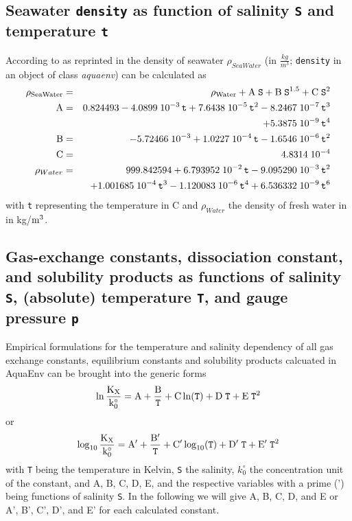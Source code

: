 \documentclass[a4paper]{article}
\begin{document}
\subsection{Seawater \texttt{density} as function of salinity \texttt{S} and temperature \texttt{t}}
According to \citep{Millero1981} as reprinted in \citet[chap. 5, p. 6f]{DOE1994} the density of seawater $\rho_{SeaWater}$ (in $\frac{kg}{m^3}$; \texttt{density} in an object of class \textit{aquaenv}) can be calculated as
\begin{eqnarray}
\rm \rho_{SeaWater} &=&\rm \rho_{Water} + A\;\mbox{\texttt{S}} + B\;\mbox{\texttt{S}}^{1.5} + C\; \mbox{\texttt{S}}^2\\
\rm A &=& \rm 0.824493 - 4.0899 \; 10^{-3} \, \mbox{\texttt{t}} + 7.6438 \; 10^{-5} \, \mbox{\texttt{t}}^2 - 8.2467 \; 10^{-7}  \,\mbox{\texttt{t}}^3\\
  && \rm + 5.3875 \; 10^{-9} \, \mbox{\texttt{t}}^4\\
\rm B &=& \rm -5.72466 \; 10^{-3} + 1.0227 \; 10^{-4} \, \mbox{\texttt{t}} - 1.6546\; 10^{-6} \, \mbox{\texttt{t}}^2 \\
\rm C &=& 4.8314\;10^{-4} \\
\rho_{Water} &=& 999.842594 + 6.793952\;10^{-2} \, \mbox{\texttt{t}} - 9.095290\;10^{-3} \, \mbox{\texttt{t}}^2\\
                                    && + 1.001685\;10^{-4}\,\mbox{\texttt{t}}^3 - 1.120083\;10^{-6} \, \mbox{\texttt{t}}^4 + 6.536332\;10^{-9} \, \mbox{\texttt{t}}^6
\end{eqnarray}
\noindent
with \texttt{t} representing the temperature in \textdegree$ $C and $\rho_{Water}$ the density of fresh water in in kg/$\rm m^3$.

\subsection{Gas-exchange constants, dissociation constant, and solubility products as functions of salinity \texttt{S}, (absolute) temperature \texttt{T}, and gauge pressure \texttt{p}}

Empirical formulations for the temperature and salinity dependency of all gas exchange constants, equilibrium constants and solubility products calcuated in \textsf{AquaEnv} can be brought into the generic forms
\begin{equation}
\rm \ln{\frac{K_X}{k_0^\circ}} = A + \frac{B}{\mbox{\texttt{T}}} + C \ln(\mbox{\texttt{T}}) + D \; \mbox{\texttt{T}} + E \;\mbox{\texttt{T}}^2
\end{equation}
or
\begin{equation}
\rm \log_{10}{\frac{K_X}{k_0^\circ}} = A' + \frac{B'}{\mbox{\texttt{T}}} + C' \log_{10}(\mbox{\texttt{T}}) + D' \; \mbox{\texttt{T}} + E' \;\mbox{\texttt{T}}^2
\end{equation}
with \texttt{T} being the temperature in Kelvin, \texttt{S} the salinity, $k_0^\circ$ the concentration unit of the constant, and A, B, C, D, E, and the respective variables with a prime (') being functions of salinity \texttt{S}.
In the following we will give A, B, C, D, and E  or A', B', C', D', and E' for each calculated constant.
\end{document}
